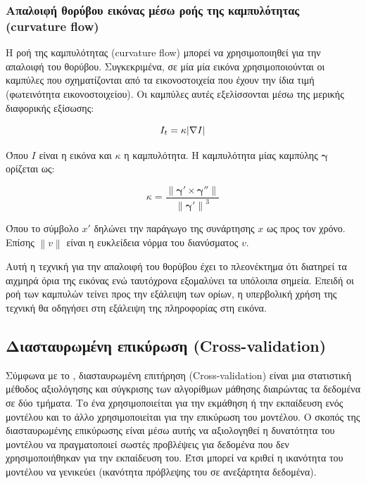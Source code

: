 \documentclass[a4paper,12pt]{article}
\DeclarePairedDelimiter\abs{\lvert}{\rvert}
\newcommand\norm[1]{\left\lVert#1\right\rVert}
\begin{document}
\subsubsection{Απαλοιφή θορύβου εικόνας μέσω ροής της καμπυλότητας (curvature
flow)}
\label{curvature_flow:1}

Η ροή της καμπυλότητας (curvature flow) μπορεί να χρησιμοποιηθεί για την
απαλοιφή του θορύβου.  Συγκεκριμένα, σε μία μία εικόνα χρησιμοποιούνται οι
καμπύλες που σχηματίζονται από τα εικονοστοιχεία που έχουν την ίδια τιμή
(φωτεινότητα εικονοστοιχείου). Οι καμπύλες αυτές εξελίσσονται
\cite{curvature_flow:1} μέσω της μερικής διαφορικής εξίσωσης:

\begin{equation} \label{eq:curvature_flow:1}
    I_t = \kappa \abs{\nabla I}
\end{equation}

Όπου $I$ είναι η εικόνα και $\kappa$ η καμπυλότητα. Η καμπυλότητα μίας καμπύλης
$\bm{\gamma}$ ορίζεται ως:

\begin{equation*}
    \kappa = \frac {\norm{\bm{\gamma}' \times \bm{\gamma}''}}
                   {\norm{\bm{\gamma}'}^3}
\end{equation*}

Όπου το σύμβολο $x'$ δηλώνει την παράγωγο της συνάρτησης $x$ ως προς τον χρόνο.
Επίσης $\norm{v}$ είναι η ευκλείδεια νόρμα του διανύσματος $v$.

Αυτή η τεχνική για την απαλοιφή του θορύβου έχει το πλεονέκτημα ότι διατηρεί
τα αιχμηρά όρια της εικόνας ενώ ταυτόχρονα εξομαλύνει τα υπόλοιπα σημεία. Επειδή
οι ροή των καμπυλών τείνει προς την εξάλειψη των ορίων, η υπερβολική χρήση της
τεχνική θα οδηγήσει στη εξάλειψη της πληροφορίας στη εικόνα.

\subsection{Διασταυρωμένη επικύρωση (Cross-validation)}

Σύμφωνα με το \cite{cross_validation:1}, διασταυρωμένη επιτήρηση
(Cross-validation) είναι μια στατιστική μέθοδος αξιολόγησης και σύγκρισης των
αλγορίθμων μάθησης διαιρώντας τα δεδομένα σε δύο τμήματα. Το ένα χρησιμοποιείται
για την εκμάθηση ή την εκπαίδευση ενός μοντέλου και το άλλο χρησιμοποιείται για
την επικύρωση του μοντέλου. Ο σκοπός της διασταυρωμένης επικύρωσης είναι μέσω
αυτής να αξιολογηθεί η δυνατότητα του μοντέλου να πραγματοποιεί σωστές
προβλέψεις για δεδομένα που δεν χρησιμοποιήθηκαν για την εκπαίδευση του. Έτσι
μπορεί να κριθεί η ικανότητα του μοντέλου να γενικεύει (ικανότητα πρόβλεψης του
σε ανεξάρτητα δεδομένα).
\end{document}
